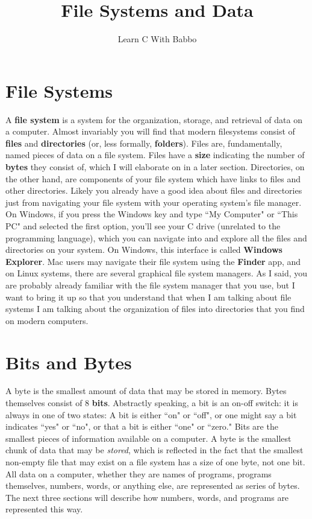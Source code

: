 \documentclass{article}
\begin{document}
\title{File Systems and Data}
\author{Learn C With Babbo}
\date{}
\maketitle
\section*{File Systems}
A \textbf{file system} is a system for the organization, storage, and retrieval of data on a computer. Almost
invariably you will find that modern filesystems consist of \textbf{files} and \textbf{directories} 
(or, less formally, \textbf{folders}). Files are, fundamentally, named pieces of data on a file system. Files have a 
\textbf{size} indicating the number of \textbf{bytes} they consist of, which I will elaborate on in a later section.
Directories, on the other hand, are components of your file system which have links to files and other directories.
Likely you already have a good idea about files and directories just from navigating your file system with your operating system's
file manager. On Windows, if you press the Windows key and type ``My Computer" or ``This PC"
and selected the first option, you'll see your C drive (unrelated to the programming language), which you can navigate
into and explore all the files and directories on your system. On Windows, this interface is called
\textbf{Windows Explorer}. Mac users may navigate their file system using the \textbf{Finder} app, and on Linux systems,
there are several graphical file system managers. As I said, you are probably already familiar with the file system
manager that you use, but I want to bring it up so that you understand that when I am talking about file systems
I am talking about the organization of files into directories that you find on modern computers.
\section*{Bits and Bytes}
A byte is the smallest amount of data that may be stored in memory. Bytes themselves consist of 8 \textbf{bits}. 
Abstractly speaking, a bit is an on-off switch: it is always in one of two states: A bit is either ``on" or ``off", 
or one might say a bit indicates ``yes" or ``no", or that a bit is either ``one" or ``zero." Bits are the smallest pieces 
of information available on a computer. A byte is the smallest chunk of data that may be
\textit{stored}, which is reflected in the fact that the smallest non-empty file that may exist on a file system has
a size of one byte, not one bit. All data on a computer, whether they are names of programs, programs themselves, numbers, 
words, or anything else, are
represented as series of bytes. The next three sections will describe how numbers, words, and programs are represented
this way.
\end{document}

